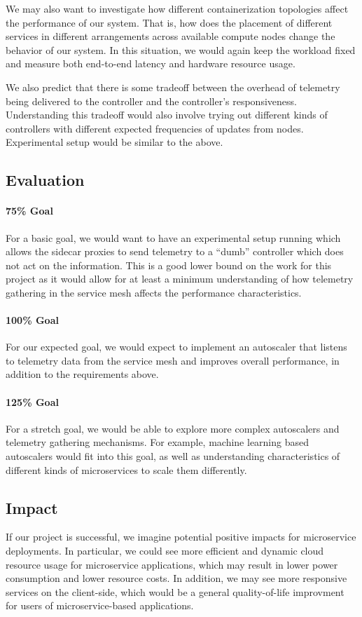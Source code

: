 \documentclass{proposal}
\begin{document}
We may also want to investigate how different containerization topologies affect the performance of our system. That is, how does the placement of different services in different arrangements across available compute nodes change the behavior of our system. In this situation, we would again keep the workload fixed and measure both end-to-end latency and hardware resource usage.

We also predict that there is some tradeoff between the overhead of telemetry being delivered to the controller and the controller's responsiveness. Understanding this tradeoff would also involve trying out different kinds of controllers with different expected frequencies of updates from nodes. Experimental setup would be similar to the above. 

\subsection{Evaluation}
\paragraph*{75\% Goal} For a basic goal, we would want to have an experimental setup running which allows the sidecar proxies to send telemetry to a ``dumb'' controller which does not act on the information. This is a good lower bound on the work for this project as it would allow for at least a minimum understanding of how telemetry gathering in the service mesh affects the performance characteristics.

\paragraph*{100\% Goal} For our expected goal, we would expect to implement an autoscaler that listens to telemetry data from the service mesh and improves overall performance, in addition to the requirements above.

\paragraph*{125\% Goal} For a stretch goal, we would be able to explore more complex autoscalers and telemetry gathering mechanisms. For example, machine learning based autoscalers would fit into this goal, as well as understanding characteristics of different kinds of microservices to scale them differently.

\subsection{Impact}
If our project is successful, we imagine potential positive impacts for microservice deployments. In particular, we could see more efficient and dynamic cloud resource usage for microservice applications, which may result in lower power consumption and lower resource costs. In addition, we may see more responsive services on the client-side, which would be a general quality-of-life improvment for users of microservice-based applications.

 
\begin{small}

\end{small}
\end{document}
